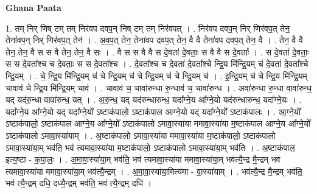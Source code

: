 \documentclass[17pt]{extarticle}
\begin{document}
\textbf{Ghana Paata } \newline

1. तम् निर् णिष् टम् तम् निर॑वप दवप॒न् निष् टम् तम् निर॑वपत् । . निर॑वप दवप॒न् निर् णिर॑वप॒त् तेन॒ तेना॑वप॒न् निर् णिर॑वप॒त् तेन॑ । . अ॒व॒प॒त् तेन॒ तेना॑वप दवप॒त् तेन॒ वै वै तेना॑वप दवप॒त् तेन॒ वै । . तेन॒ वै वै तेन॒ तेन॒ वै स स वै तेन॒ तेन॒ वै सः । . वै स स वै वै स दे॒वता॑ दे॒वताः॒ स वै वै स दे॒वताः᳚ । . स दे॒वता॑ दे॒वताः॒ स स दे॒वता᳚श्च च दे॒वताः॒ स स दे॒वता᳚श्च । . दे॒वता᳚श्च च दे॒वता॑ दे॒वता᳚श्चे न्द्रि॒य मि॑न्द्रि॒यम् च॑ दे॒वता॑ दे॒वता᳚श्चे न्द्रि॒यम् । . चे॒ न्द्रि॒य मि॑न्द्रि॒यम् च॑ चे न्द्रि॒यम् च॑ चे न्द्रि॒यम् च॑ चे न्द्रि॒यम् च॑ । . इ॒न्द्रि॒यम् च॑ चे न्द्रि॒य मि॑न्द्रि॒यम् चावाव॑ चे न्द्रि॒य मि॑न्द्रि॒यम् चाव॑ । . चावाव॑ च॒ चावा॑रुन्धा रु॒न्धाव॑ च॒ चावा॑रुन्ध । . अवा॑रुन्धा रु॒न्धा वावा॑रुन्ध॒ यद् यद॑रु॒न्धा वावा॑रुन्ध॒ यत् । . अ॒रु॒न्ध॒ यद् यद॑रुन्धारुन्ध॒ यदा᳚ग्ने॒य आ᳚ग्ने॒यो यद॑रुन्धारुन्ध॒ यदा᳚ग्ने॒यः । . यदा᳚ग्ने॒य आ᳚ग्ने॒यो यद् यदा᳚ग्ने॒यो᳚ ऽष्टाक॑पालो॒ ऽष्टाक॑पाल आग्ने॒यो यद् यदा᳚ग्ने॒यो᳚ ऽष्टाक॑पालः । . आ॒ग्ने॒यो᳚ ऽष्टाक॑पालो॒ ऽष्टाक॑पाल आग्ने॒य आ᳚ग्ने॒यो᳚ ऽष्टाक॑पालो ऽमावा॒स्या॑या ममावा॒स्या॑या म॒ष्टाक॑पाल आग्ने॒य आ᳚ग्ने॒यो᳚ ऽष्टाक॑पालो ऽमावा॒स्या॑याम् । . अ॒ष्टाक॑पालो ऽमावा॒स्या॑या ममावा॒स्या॑या म॒ष्टाक॑पालो॒ ऽष्टाक॑पालो ऽमावा॒स्या॑या॒म् भव॑ति॒ भव॑ त्यमावा॒स्या॑या म॒ष्टाक॑पालो॒ ऽष्टाक॑पालो ऽमावा॒स्या॑या॒म् भव॑ति । . अ॒ष्टाक॑पाल॒ इत्य॒ष्टा - क॒पा॒लः॒ । . अ॒मा॒वा॒स्या॑या॒म् भव॑ति॒ भव॑ त्यमावा॒स्या॑या ममावा॒स्या॑या॒म् भव॑त्यै॒न्द्र मै॒न्द्रम् भव॑ त्यमावा॒स्या॑या ममावा॒स्या॑या॒म् भव॑त्यै॒न्द्रम् । . अ॒मा॒वा॒स्या॑या॒मित्य॑मा - वा॒स्या॑याम् । . भव॑त्यै॒न्द्र मै॒न्द्रम् भव॑ति॒ भव॑ त्यै॒न्द्रम् दधि॒ दध्यै॒न्द्रम् भव॑ति॒ भव॑ त्यै॒न्द्रम् दधि॑ । \newline
\end{document}
